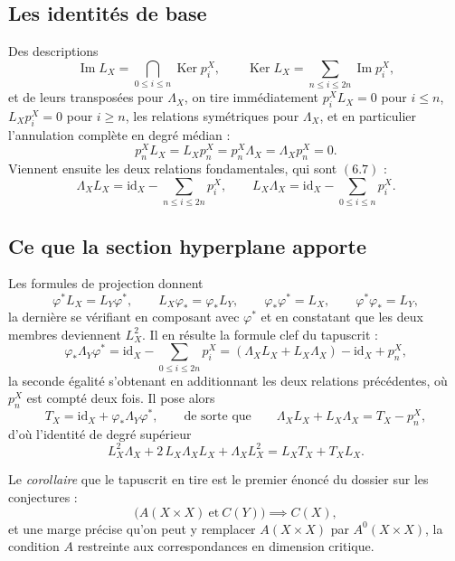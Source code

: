 \documentclass[11pt,a4paper]{article}
\begin{document}
\subsection*{Les identités de base}

Des descriptions
\[
\operatorname{Im} L_{X} = \bigcap_{0 \leqslant i \leqslant n} \operatorname{Ker} p^{X}_{i},
\qquad
\operatorname{Ker} L_{X} = \sum_{n \leqslant i \leqslant 2n} \operatorname{Im} p^{X}_{i},
\]
et de leurs transposées pour $\Lambda_{X}$, on tire immédiatement
$p^{X}_{i}L_{X} = 0$ pour $i \leqslant n$, $L_{X}p^{X}_{i} = 0$ pour
$i \geqslant n$, les relations symétriques pour $\Lambda_{X}$, et en
particulier l'annulation complète en degré médian :
\[
p^{X}_{n}L_{X} = L_{X}p^{X}_{n} = p^{X}_{n}\Lambda_{X} = \Lambda_{X}p^{X}_{n} = 0 .
\]
Viennent ensuite les deux relations fondamentales, qui sont $(6.7)$ :
\[
\Lambda_{X}L_{X} = \mathrm{id}_{X} - \sum_{n \leqslant i \leqslant 2n} p^{X}_{i},
\qquad
L_{X}\Lambda_{X} = \mathrm{id}_{X} - \sum_{0 \leqslant i \leqslant n} p^{X}_{i} .
\]

\subsection*{Ce que la section hyperplane apporte}

Les formules de projection donnent
\[
\varphi^{*}L_{X} = L_{Y}\varphi^{*}, \qquad
L_{X}\varphi_{*} = \varphi_{*}L_{Y}, \qquad
\varphi_{*}\varphi^{*} = L_{X}, \qquad \varphi^{*}\varphi_{*} = L_{Y} ,
\]
la dernière se vérifiant en composant avec $\varphi^{*}$ et en constatant que
les deux membres deviennent $L_{X}^{2}$. Il en résulte la formule clef du
tapuscrit :
\[
\varphi_{*}\Lambda_{Y}\varphi^{*}
= \mathrm{id}_{X} - \sum_{0 \leqslant i \leqslant 2n} p^{X}_{i}
= (\Lambda_{X}L_{X} + L_{X}\Lambda_{X}) - \mathrm{id}_{X} + p^{X}_{n},
\]
la seconde égalité s'obtenant en additionnant les deux relations précédentes,
où $p^{X}_{n}$ est compté deux fois. Il pose alors
\[
T_{X} = \mathrm{id}_{X} + \varphi_{*}\Lambda_{Y}\varphi^{*},
\qquad\text{de sorte que}\qquad
\Lambda_{X}L_{X} + L_{X}\Lambda_{X} = T_{X} - p^{X}_{n},
\]
d'où l'identité de degré supérieur
\[
L_{X}^{2}\Lambda_{X} + 2\,L_{X}\Lambda_{X}L_{X} + \Lambda_{X}L_{X}^{2}
= L_{X}T_{X} + T_{X}L_{X} .
\]

Le \emph{corollaire} que le tapuscrit en tire est le premier énoncé du dossier
sur les conjectures :
\[
\bigl( A(X \times X) \ \text{et}\ C(Y) \bigr) \implies C(X),
\]
et une marge précise qu'on peut y remplacer $A(X \times X)$ par
$A^{0}(X \times X)$, la condition $A$ restreinte aux correspondances en
dimension critique.
\end{document}
